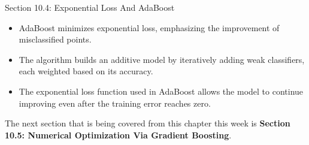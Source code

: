 \begin{notes}{Section 10.4: Exponential Loss And AdaBoost}
    \begin{highlight}
        \begin{itemize}
            \item AdaBoost minimizes exponential loss, emphasizing the improvement of misclassified points.
            \item The algorithm builds an additive model by iteratively adding weak classifiers, each weighted based on its accuracy.
            \item The exponential loss function used in AdaBoost allows the model to continue improving even after the training error reaches zero.
        \end{itemize}
    \end{highlight}
\end{notes}

The next section that is being covered from this chapter this week is \textbf{Section 10.5: Numerical Optimization Via Gradient Boosting}.

